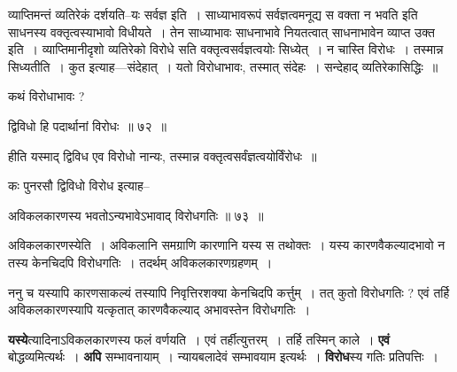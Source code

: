 \documentclass[article,12pt,a4paper]{memoir}
\begin{document}
	  \pstart व्याप्तिमन्तं व्यतिरेकं दर्शयति--यः सर्वज्ञ इति । साध्याभावरूपं सर्वज्ञत्वमनूद्य  स वक्ता न भवति इति साधनस्य वक्तृत्वस्याभावो विधीयते । तेन साध्याभावः साधनाभावे नियतत्वात् साधनाभावेन व्याप्त उक्त इति । व्याप्तिमानीदृशो व्यतिरेको विरोधे सति वक्तृत्वसर्वज्ञत्वयोः सिध्येत् । न चास्ति विरोधः । तस्मान्न सिध्यतीति । कुत इत्याह—संदेहात् । यतो विरोधाभावः, तस्मात् संदेहः । सन्देहाद् व्यतिरेकासिद्धिः ॥
	\pend
        

	  \pstart कथं विरोधाभावः ?
	\pend
        
	  \bigskip
	  \begingroup
	

	  \pstart द्विविधो हि पदार्थानां विरोधः ॥ ७२ ॥
	\pend
      
	  \endgroup
	 

	  \pstart {}हीति यस्माद् द्विविध एव विरोधो नान्यः, तस्मान्न वक्तृत्वसर्वंज्ञत्वयोर्विंरोधः ॥
	\pend
        

	  \pstart कः पुनरसौ द्विविधो विरोध इत्याह--
	\pend
        
	  \bigskip
	  \begingroup
	

	  \pstart अविकलकारणस्य भवतोऽन्यभावेऽभावाद् विरोधगतिः ॥ ७३ ॥
	\pend
      
	  \endgroup
	 

	  \pstart अविकलकारणस्येति । अविकलानि समग्राणि कारणानि यस्य स तथोक्तः । यस्य कारणवैकल्यादभावो न तस्य केनचिदपि विरोधगतिः । तदर्थम् अविकलकारणग्रहणम् ।
	\pend
        

	  \pstart ननु च यस्यापि कारणसाकल्यं तस्यापि निवृत्तिरशक्या केनचिदपि कर्त्तुम् । तत् कुतो विरोधगतिः ? एवं तर्हि अविकलकारणस्यापि यत्कृतात् कारणवैकल्याद् अभावस्तेन विरोधगतिः ।
	\pend
      
	  \endgroup
	

	  \pstart \textbf{यस्ये}त्यादिनाऽविकलकारणस्य फलं वर्णयति । एवं तर्हीत्युत्तरम् । तर्हि तस्मिन् काले । \textbf{एवं} बोद्धव्यमित्यर्थः । \textbf{अपि} सम्भावनायाम् । न्यायबलादेवं सम्भावयाम इत्यर्थः । \textbf{विरोध}स्य गतिः प्रतिपत्तिः ।
	\pend
	  \bigskip
	  \begingroup
	
\end{document}
